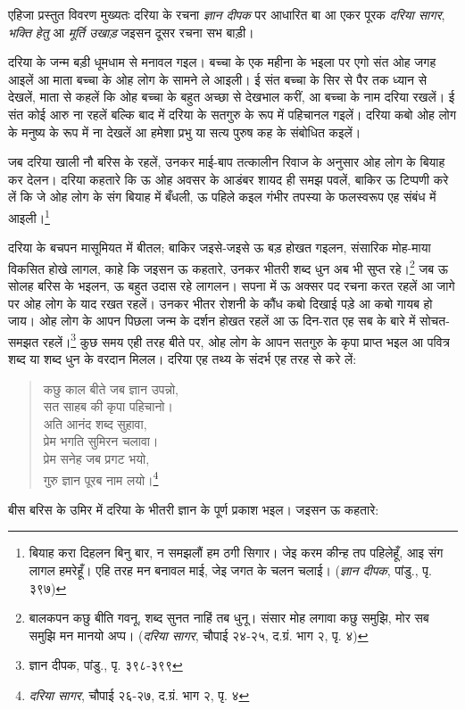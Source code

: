 एहिजा प्रस्तुत विवरण मुख्यतः दरिया के रचना \textit{ज्ञान दीपक} पर आधारित बा आ एकर पूरक \textit{दरिया सागर}, \textit{भक्ति हेतु} आ \textit{मूर्ति उखाड़} जइसन दूसर रचना सभ बाड़ी।

दरिया के जन्म बड़ी धूमधाम से मनावल गइल। बच्चा के एक महीना के भइला पर एगो संत ओह जगह आइलें आ माता बच्चा के ओह लोग के सामने ले आइली। ई संत बच्चा के सिर से पैर तक ध्यान से देखलें, माता से कहलें कि ओह बच्चा के बहुत अच्छा से देखभाल करीं, आ बच्चा के नाम दरिया रखलें। ई संत कोई आरु ना रहलें बल्कि बाद में दरिया के सतगुरु के रूप में पहिचानल गइलें। दरिया कबो ओह लोग के मनुष्य के रूप में ना देखलें आ हमेशा प्रभु या सत्य पुरुष कह के संबोधित कइलें।

जब दरिया खाली नौ बरिस के रहलें, उनकर माई-बाप तत्कालीन रिवाज के अनुसार ओह लोग के बियाह कर देलन। दरिया कहतारे कि ऊ ओह अवसर के आडंबर शायद ही समझ पवलें, बाकिर ऊ टिप्पणी करे लें कि जे ओह लोग के संग बियाह में बँधली, ऊ पहिले कइल गंभीर तपस्या के फलस्वरूप एह संबंध में आइली।\footnote{बियाह करा दिहलन बिनु बार, न समझलौं हम ठगी सिगार। जेइ करम कीन्ह तप पहिलेहूँ, आइ संग लागल हमरेहूँ। एहि तरह मन बनावल माई, जेइ जगत के चलन चलाई। (\textit{ज्ञान दीपक}, पांडु., पृ. ३९७)}

दरिया के बचपन मासूमियत में बीतल; बाकिर जइसे-जइसे ऊ बड़ होखत गइलन, संसारिक मोह-माया विकसित होखे लागल, काहे कि जइसन ऊ कहतारे, उनकर भीतरी शब्द धुन अब भी सुप्त रहे।\footnote{बालकपन कछु बीति गवनू, शब्द सुनत नाहिं तब धुनू। संसार मोह लगावा कछु समुझि, मोर सब समुझि मन मानयो अप्प। (\textit{दरिया सागर}, चौपाई २४-२५, द.ग्रं. भाग २, पृ. ४)} जब ऊ सोलह बरिस के भइलन, ऊ बहुत उदास रहे लागलन। सपना में ऊ अक्सर पद रचना करत रहलें आ जागे पर ओह लोग के याद रखत रहलें। उनकर भीतर रोशनी के कौंध कबो दिखाई पड़े आ कबो गायब हो जाय। ओह लोग के आपन पिछला जन्म के दर्शन होखत रहलें आ ऊ दिन-रात एह सब के बारे में सोचत-समझत रहलें।\footnote{ज्ञान दीपक, पांडु., पृ. ३९८-३९९} कुछ समय एही तरह बीते पर, ओह लोग के आपन सतगुरु के कृपा प्राप्त भइल आ पवित्र शब्द या शब्द धुन के वरदान मिलल। दरिया एह तथ्य के संदर्भ एह तरह से करे लें:

\begin{quote}
कछु काल बीते जब ज्ञान उपन्नो,\\
सत साहब की कृपा पहिचानो।\\
अति आनंद शब्द सुहावा,\\
प्रेम भगति सुमिरन चलावा।\\
प्रेम सनेह जब प्रगट भयो,\\
गुरु ज्ञान पूरब नाम लयो।\footnote{\textit{दरिया सागर}, चौपाई २६-२७, द.ग्रं. भाग २, पृ. ४}
\end{quote}

बीस बरिस के उमिर में दरिया के भीतरी ज्ञान के पूर्ण प्रकाश भइल। जइसन ऊ कहतारे:


